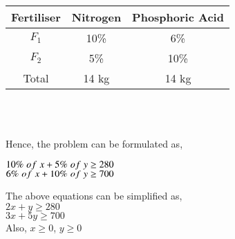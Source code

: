 \documentclass[journal,12pt,twocolumn]{IEEEtran}
\begin{document}
\centering
\begin{tabular}{|c|c|c|}
\hline
\textbf{Fertiliser} & \textbf{Nitrogen} & \textbf{Phosphoric Acid} \\
\hline
$F_1$ & 10\% & 6\% \\
\hline
$F_2$ & 5\% & 10\% \\
\hline
Total & 14 kg & 14 kg\\
\hline
\end{tabular}
\
\vspace{0.25cm}
\raggedright
\\Hence, the problem can be formulated as,\\
\vspace{0.25cm}

\centering

$ 10 \% \hspace{0.1cm}of\hspace{0.1cm} x + 5 \% \hspace{0.1cm}of\hspace{0.1cm}  y \geq 280$\\
\vspace{0.25cm}
$ 6 \%\hspace{0.1cm} of \hspace{0.1cm}x + 10 \% \hspace{0.1cm}of \hspace{0.1cm}y \geq 700$\\
\vspace{0.25cm}
\raggedright
The above equations can be simplified as,\\
\centering
\vspace{0.25cm}
$2x + y \geq 280$\\
\vspace{0.25cm}
$3x + 5y \geq 700$\\
\vspace{0.25cm}
Also, $x \geq 0$, $y \geq 0$\\
\vspace{0.25cm}

\raggedright
\end{document}
